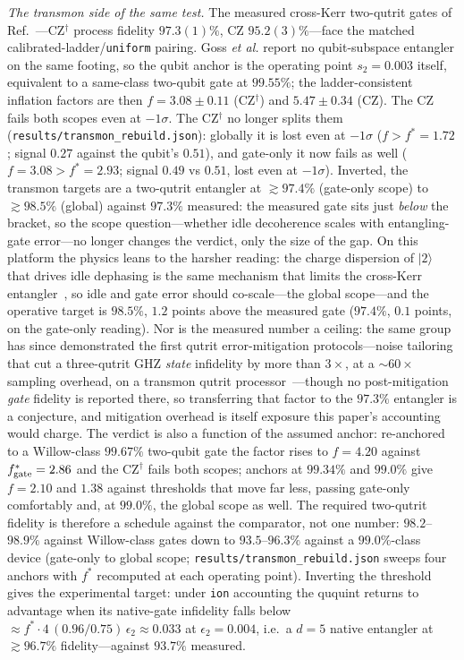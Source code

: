 \documentclass[aps,pra,reprint,superscriptaddress,nofootinbib,floatfix]{revtex4-2}
\begin{document}
\emph{The transmon side of the same test.} The measured cross-Kerr
two-qutrit gates of Ref.~\cite{goss2022}---CZ$^\dagger$ process
fidelity $97.3(1)\%$, CZ $95.2(3)\%$---face the matched
calibrated-ladder/\texttt{uniform} pairing. Goss \emph{et al.} report
no qubit-subspace entangler on the same footing, so the qubit anchor
is the operating point $s_2=0.003$ itself, equivalent to a
same-class two-qubit gate at $99.55\%$; the ladder-consistent
inflation factors are then $f=3.08\pm0.11$ (CZ$^\dagger$) and
$5.47\pm0.34$ (CZ). The CZ fails both scopes even at $-1\sigma$.
The CZ$^\dagger$ no longer splits them
(\texttt{results/transmon\_rebuild.json}): globally it is lost even
at $-1\sigma$ ($f>f^\ast=1.72$; signal $0.27$ against the qubit's
$0.51$), and gate-only it now fails as well
($f=3.08>f^\ast=2.93$; signal $0.49$ vs $0.51$, lost even at
$-1\sigma$). Inverted, the
transmon targets are a two-qutrit entangler at ${\gtrsim}97.4\%$
(gate-only scope) to ${\gtrsim}98.5\%$ (global) against $97.3\%$
measured: the measured gate sits just \emph{below} the bracket, so
the scope question---whether idle decoherence scales with
entangling-gate error---no longer changes the verdict, only the
size of the gap. On this platform the physics leans to
the harsher reading: the charge dispersion of $\lvert2\rangle$ that
drives idle dephasing is the same mechanism that limits the
cross-Kerr entangler~\cite{blok2021,goss2022}, so idle and gate
error should co-scale---the global scope---and the operative target
is $98.5\%$, $1.2$ points above the measured gate ($97.4\%$, $0.1$
points, on the gate-only reading). Nor is the
measured number a ceiling: the same group has since demonstrated the
first qutrit error-mitigation protocols---noise tailoring that cut a
three-qutrit GHZ \emph{state} infidelity by more than $3\times$, at a
${\sim}60\times$ sampling overhead, on a transmon qutrit
processor~\cite{goss2024}---though no post-mitigation \emph{gate}
fidelity is reported there, so transferring that factor to the
$97.3\%$ entangler is a conjecture, and mitigation overhead is
itself exposure this paper's accounting would charge. The verdict is
also a function of the assumed anchor: re-anchored to a
Willow-class $99.67\%$ two-qubit gate the factor rises to $f=4.20$
against $f^\ast_{\rm gate}=2.86$ and the CZ$^\dagger$ fails both
scopes; anchors at $99.34\%$ and $99.0\%$ give $f=2.10$ and $1.38$
against thresholds that move far less, passing gate-only
comfortably and, at $99.0\%$, the global scope as well. The
required two-qutrit fidelity is therefore a schedule against the
comparator, not one number: $98.2$--$98.9\%$ against Willow-class
gates down to $93.5$--$96.3\%$ against a $99.0\%$-class device
(gate-only to global scope;
\texttt{results/transmon\_rebuild.json} sweeps four anchors with
$f^\ast$ recomputed at each operating point).
Inverting the threshold gives the experimental target: under
\texttt{ion} accounting the ququint returns to advantage when its
native-gate infidelity falls below
${\approx}f^\ast\cdot 4\,(0.96/0.75)\,\epsilon_2\approx0.033$ at
$\epsilon_2=0.004$, i.e.\ a $d=5$ native entangler at ${\gtrsim}96.7\%$
fidelity---against $93.7\%$ measured.
\end{document}
